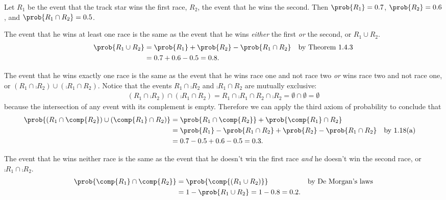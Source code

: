 \documentclass[11pt, newpage]{homework}
\begin{document}
\maketitle

Let \(R_1\) be the event that the track star wins the first race, \(R_2\), the event that he wins the second. Then \(\prob{R_1} = 0.7\), \(\prob{R_2} = 0.6\), and \(\prob{R_1 \cap R_2} = 0.5\).

\begin{alphaparts}
	\questionpart %
	The event that he wins at least one race is the same as the event that he wins \textit{either} the first \textit{or} the second, or \(R_1 \cup R_2\).
	\begin{align*}
		\prob{R_1 \cup R_2} &= \prob{R_1} + \prob{R_2} - \prob{R_1 \cap R_2} && \text{by Theorem 1.4.3} \\
		&=0.7 + 0.6 - 0.5 = 0.8.\\
	\end{align*}

	\questionpart %
	\newcommand{\onlyfirst}{R_1 \cap \comp{R_2}}
	\newcommand{\onlysecond}{\comp{R_1} \cap R_2}
	\newcommand{\atleastone}{\left(\onlyfirst\right)\cup \left(\onlysecond\right)}
	The event that he wins exactly one race is the same as the event that he wins race one and not race two \textit{or} wins race two and not race one, or \(\atleastone\). Notice that the events \(\onlyfirst\) and \(\onlysecond\) are mutually exclusive:
	\begin{align*}
		\left(\onlyfirst\right) \cap \left(\onlysecond\right) = R_1 \cap \comp{R_1} \cap R_2 \cap \comp{R_2} = \emptyset \cap \emptyset = \emptyset
	\end{align*}
	because the intersection of any event with its complement is empty. Therefore we can apply the third axiom of probability to conclude that
	\begin{align*}
		\prob{\atleastone} &= \prob{\onlyfirst} + \prob{\onlysecond} \\
		&= \prob{R_1} - \prob{R_1 \cap R_2} + \prob{R_2} - \prob{R_1 \cap R_2} && \text{by 1.18(a)} \\
		&= 0.7 - 0.5 + 0.6 - 0.5 = 0.3.\\
	\end{align*}
	
	\questionpart %
	The event that he wins neither race is the same as the event that he doesn't win the first race \textit{and} he doesn't win the second race, or \(\comp{R_1} \cap \comp{R_2}\).
	\begin{align*}
		\prob{\comp{R_1} \cap \comp{R_2}} &= \prob{\comp{\left(R_1 \cup R_2\right)}} && \text{by De Morgan's laws} \\
		&= 1 - \prob{R_1 \cup R_2} = 1 - 0.8 = 0.2.\\
	\end{align*}
\end{alphaparts}
\end{document}
